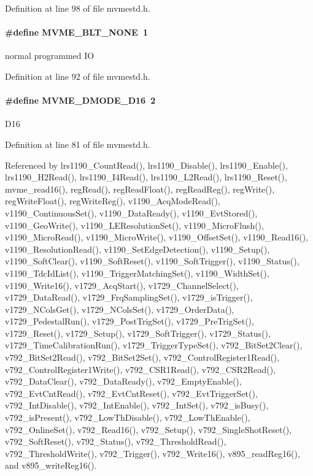 Definition at line 98 of file mvmestd.h.
\paragraph[{MVME\_\-BLT\_\-NONE}]{\setlength{\rightskip}{0pt plus 5cm}\#define MVME\_\-BLT\_\-NONE~1}\hfill\label{group__mvmestdinclude_ga820b9a818f3f5b5741c6bd20ebf0cead}
normal programmed IO 

Definition at line 92 of file mvmestd.h.
\paragraph[{MVME\_\-DMODE\_\-D16}]{\setlength{\rightskip}{0pt plus 5cm}\#define MVME\_\-DMODE\_\-D16~2}\hfill\label{group__mvmestdinclude_ga36525e38132744a48e26d7ee2b158d2c}
D16 

Definition at line 81 of file mvmestd.h.

Referenced by lrs1190\_\-CountRead(), lrs1190\_\-Disable(), lrs1190\_\-Enable(), lrs1190\_\-H2Read(), lrs1190\_\-I4Read(), lrs1190\_\-L2Read(), lrs1190\_\-Reset(), mvme\_\-read16(), regRead(), regReadFloat(), regReadReg(), regWrite(), regWriteFloat(), regWriteReg(), v1190\_\-AcqModeRead(), v1190\_\-ContinuousSet(), v1190\_\-DataReady(), v1190\_\-EvtStored(), v1190\_\-GeoWrite(), v1190\_\-LEResolutionSet(), v1190\_\-MicroFlush(), v1190\_\-MicroRead(), v1190\_\-MicroWrite(), v1190\_\-OffsetSet(), v1190\_\-Read16(), v1190\_\-ResolutionRead(), v1190\_\-SetEdgeDetection(), v1190\_\-Setup(), v1190\_\-SoftClear(), v1190\_\-SoftReset(), v1190\_\-SoftTrigger(), v1190\_\-Status(), v1190\_\-TdcIdList(), v1190\_\-TriggerMatchingSet(), v1190\_\-WidthSet(), v1190\_\-Write16(), v1729\_\-AcqStart(), v1729\_\-ChannelSelect(), v1729\_\-DataRead(), v1729\_\-FrqSamplingSet(), v1729\_\-isTrigger(), v1729\_\-NColsGet(), v1729\_\-NColsSet(), v1729\_\-OrderData(), v1729\_\-PedestalRun(), v1729\_\-PostTrigSet(), v1729\_\-PreTrigSet(), v1729\_\-Reset(), v1729\_\-Setup(), v1729\_\-SoftTrigger(), v1729\_\-Status(), v1729\_\-TimeCalibrationRun(), v1729\_\-TriggerTypeSet(), v792\_\-BitSet2Clear(), v792\_\-BitSet2Read(), v792\_\-BitSet2Set(), v792\_\-ControlRegister1Read(), v792\_\-ControlRegister1Write(), v792\_\-CSR1Read(), v792\_\-CSR2Read(), v792\_\-DataClear(), v792\_\-DataReady(), v792\_\-EmptyEnable(), v792\_\-EvtCntRead(), v792\_\-EvtCntReset(), v792\_\-EvtTriggerSet(), v792\_\-IntDisable(), v792\_\-IntEnable(), v792\_\-IntSet(), v792\_\-isBusy(), v792\_\-isPresent(), v792\_\-LowThDisable(), v792\_\-LowThEnable(), v792\_\-OnlineSet(), v792\_\-Read16(), v792\_\-Setup(), v792\_\-SingleShotReset(), v792\_\-SoftReset(), v792\_\-Status(), v792\_\-ThresholdRead(), v792\_\-ThresholdWrite(), v792\_\-Trigger(), v792\_\-Write16(), v895\_\-readReg16(), and v895\_\-writeReg16().
